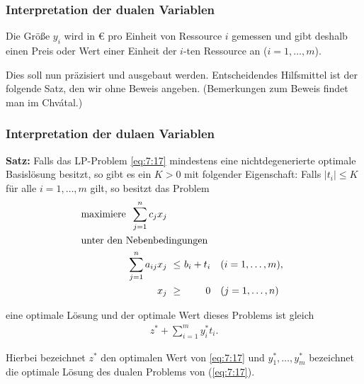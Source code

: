 \documentclass[smaller]{beamer}
\begin{document}
\begin{frame}
 \frametitle{Interpretation der dualen Variablen}

Die Größe $y_i$  wird in {\euro} pro Einheit von Ressource $i$ gemessen und gibt deshalb einen \alert{Preis oder Wert einer Einheit der $i$-ten Ressource an} ($i=1,\ldots,m$).  \\ \vspace*{0.2cm}

Dies soll nun präzisiert und ausgebaut werden. Entscheidendes Hilfsmittel ist der folgende Satz, den wir ohne Beweis angeben. (Bemerkungen zum Beweis findet man im Chvátal.)
\end{frame}

\begin{frame}
 \frametitle{Interpretation der dulaen Variablen}
 \textbf{Satz:} Falls das LP-Problem \eqref{eq:7:17} mindestens eine nichtdegenerierte optimale Basislösung besitzt, so gibt es ein $K > 0$ mit folgender Eigenschaft: Falls $|t_i| \leq K$ für alle $i=1,\ldots,m$ gilt, so besitzt das Problem
\begin{align}
\begin{alignedat}{4}
\label{eq:7:19}
& \text{maximiere } & \sum\limits_{j=1}^{n}{c_jx_j} & & & \\
& \rlap{unter den Nebenbedingungen} & & & & \\
&& \sum\limits_{j=1}^{n}{a_{ij}x_j} &\ \leq &\ b_i + t_i & \quad (i=1,\ldots,m),\ \\
&&                              x_j &\ \geq &\         0 & \quad (j=1,\ldots,n)
\end{alignedat}
\end{align}

eine optimale Lösung und der optimale Wert dieses Problems ist gleich
\begin{equation}
\label{eq:7:20}
\begin{aligned}
z^* + \sum\limits_{i=1}^{m}{y_i^*t_i}.
\end{aligned}
\end{equation}

Hierbei bezeichnet $z^*$ den optimalen Wert von \eqref{eq:7:17} und $y_1^*,\ldots,y_m^*$ bezeichnet die optimale Lösung des dualen Problems von (\ref{eq:7:17}).
\end{frame}
\end{document}
